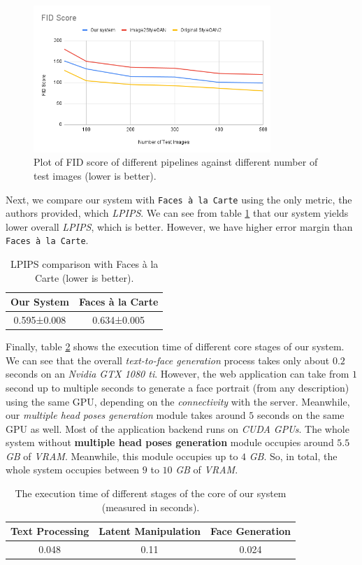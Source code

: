 \begin{figure}[H]
    \centering
    \includegraphics[width=0.8\textwidth]{images/fid_score.png}
    \caption{Plot of FID score of different pipelines against different number of test images (lower is better).}
    \label{fig:fid}
\end{figure}

Next, we compare our system with \texttt{Faces à la Carte} using the only metric, the authors provided, which \emph{LPIPS}. We can see from table \ref{tab:lpips_comp} that our system yields lower overall \emph{LPIPS}, which is better. However, we have higher error margin than \texttt{Faces à la Carte}.

\begin{table}[ht]
\centering
\caption{LPIPS comparison with Faces à la Carte (lower is better).}
\begin{tabular}[t]{| c | c |}
\hline
Our System & Faces à la Carte \\
\hline
\hline
0.595±0.008 & 0.634±0.005 \\
\hline
\end{tabular}
\label{tab:lpips_comp}
\end{table}

Finally, table \ref{tab:exec_time} shows the execution time of different core stages of our system. We can see that the overall \emph{text-to-face generation} process takes only about $0.2$ seconds on an \emph{Nvidia GTX 1080 ti}. However, the web application can take from $1$ second up to multiple seconds to generate a face portrait (from any description) using the same GPU, depending on the \emph{connectivity} with the server. Meanwhile, our \emph{multiple head poses generation} module takes around $5$ seconds on the same GPU as well. Most of the application backend runs on \emph{CUDA GPUs}. The whole system without \textbf{multiple head poses generation} module occupies around $5.5$ \emph{GB} of \emph{VRAM}. Meanwhile, this module occupies up to $4$ \emph{GB}. So, in total, the whole system occupies between $9$ to $10$ \emph{GB} of \emph{VRAM}.

\begin{table}[ht]
\centering
\caption{The execution time of different stages of the core of our system (measured in seconds).}
\begin{tabular}[t]{| c | c | c |}
\hline
Text Processing & Latent Manipulation & Face Generation \\
\hline
\hline
0.048 & 0.11 & 0.024 \\
\hline
\end{tabular}
\label{tab:exec_time}
\end{table}
